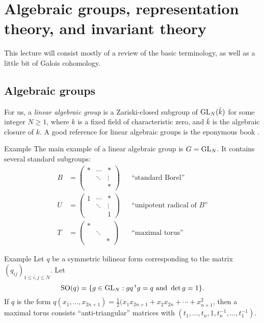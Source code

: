 
\section{Algebraic groups, representation theory, and invariant theory}





This lecture will consist mostly of a review of the basic terminology, as 
well as a little bit of Galois cohomology. 





\subsection{Algebraic groups}

For us, a \emph{linear algebraic group} is a Zariski-closed subgroup of 
$\operatorname{GL}_N(\bar k)$ for some integer $N\geqslant 1$, where $k$ is a 
fixed field of characteristic zero, and $\bar k$ is the algebraic closure of 
$k$. A good reference for linear algebraic groups is the eponymous book 
\cite{b91}. 

\begin{enonce}[remark]{Example}
The main example of a linear algebraic group is $G=\operatorname{GL}_N$. It 
contains several standard subgroups:
\begin{align*}
  B &= \begin{pmatrix} \ast & \cdots & \ast \\ & \ddots & \vdots \\ & & \ast \end{pmatrix} && \text{``standard Borel''} \\
  U &= \begin{pmatrix} 1 & \cdots & \ast \\ & \ddots & \vdots \\ & & 1\end{pmatrix} && \text{``unipotent radical of $B$''} \\
  T &= \begin{pmatrix} \ast \\ & \ddots \\ & & \ast \end{pmatrix} && \text{``maximal torus''}
\end{align*}
\end{enonce}

\begin{enonce}[remark]{Example}
Let $q$ be a symmetric bilinear form corresponding to the matrix 
$(q_{i j})_{1\leqslant i,j\leqslant N}$. Let 
\[
  \operatorname{SO}(q) = \{g\in \operatorname{GL}_N: g q \prescript{\mathrm{t}}{}{g} = q\text{ and }\det g=1\} .
\]
If $q$ is the form 
$q(x_1,\dots,x_{2n+1}) = \frac 1 2 (x_1 x_{2n+1} + x_2 x_{2n} + \cdots + x_{n+1}^2$, 
then a maximal torus consists ``anti-triangular'' matrices with 
$(t_1,\dots,t_n,1,t_n^{-1},\dots,t_1^{-1})$. 
\end{enonce}

